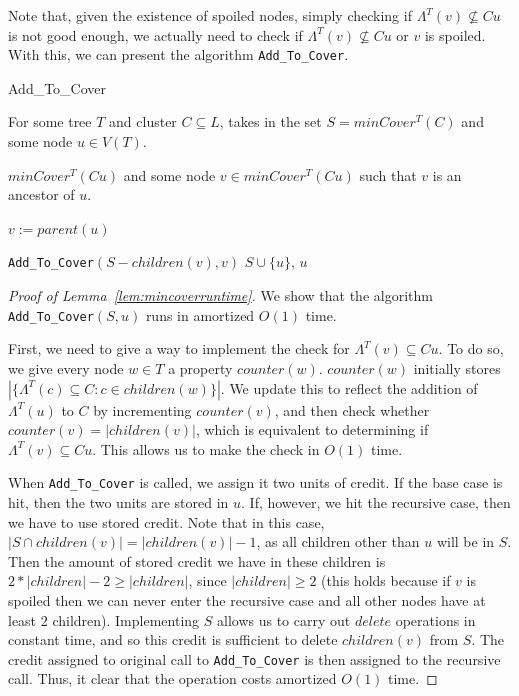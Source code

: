 \documentclass{article}
\newcommand{\leafset}{\Lambda}
\begin{document}
    Note that, given the existence of spoiled nodes, simply checking if $\leafset^{T}(v) \not\subseteq Cu$ is not good enough, we actually need to check if $\leafset^{T}(v) \not\subseteq Cu$ or $v$ is spoiled. With this, we can present the algorithm \texttt{Add\_To\_Cover}.

    \begin{algorithm}
        \caption{Add\_To\_Cover}
        \label{alg:addtocover}

        \begin{algorithmic}[1]
            \Input For some tree $T$ and cluster $C \subseteq L$, takes in the set $S = minCover^{T}(C)$ and some node $u \in V(T)$.

            \Output $minCover^{T}(Cu)$ and some node $v \in minCover^{T}(Cu)$ such that $v$ is an ancestor of $u$.

            \State $v := parent(u)$

            \If{$\leafset^{T}(v) \subseteq Cu$ and $v$ is not spoiled}
                \State \Return \texttt{Add\_To\_Cover}$(S - children(v), v)$
            \Else
                \State \Return $S \cup \{u\}$, $u$
            \EndIf
        \end{algorithmic}
    \end{algorithm}

    \begin{proof}[Proof of Lemma~\ref{lem:mincoverruntime}]
        We show that the algorithm \texttt{Add\_To\_Cover}$(S, u)$ runs in amortized $O(1)$ time.

        First, we need to give a way to implement the check for $\leafset^{T}(v) \subseteq Cu$. To do so, we give every node $w \in T$ a property $counter(w)$. $counter(w)$ initially stores $|\{\leafset^{T}(c) \subseteq C : c \in children(w)\}|$. We update this to reflect the addition of $\leafset^{T}(u)$ to $C$ by incrementing $counter(v)$, and then check whether $counter(v) = |children(v)|$, which is equivalent to determining if $\leafset^{T}(v) \subseteq Cu$. This allows us to make the check in $O(1)$ time.

        When \texttt{Add\_To\_Cover} is called, we assign it two units of credit. If the base case is hit, then the two units are stored in $u$. If, however, we hit the recursive case, then we have to use stored credit. Note that in this case, $|S \cap children(v)| = |children(v)| - 1$, as all children other than $u$ will be in $S$. Then the amount of stored credit we have in these children is $2 * |children| - 2 \geq |children|$, since $|children| \geq 2$ (this holds because if $v$ is spoiled then we can never enter the recursive case and all other nodes have at least $2$ children). Implementing $S$ allows us to carry out $delete$ operations in constant time, and so this credit is sufficient to delete $children(v)$ from $S$. The credit assigned to original call to \texttt{Add\_To\_Cover} is then assigned to the recursive call. Thus, it clear that the operation costs amortized $O(1)$ time.
    \end{proof}
\end{document}
